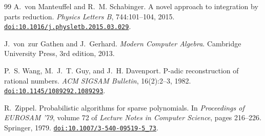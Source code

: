 \documentclass[11pt,a4paper]{article}
\theoremstyle{plain}
\theoremstyle{definition}
\theoremstyle{remark}
\newcommand{\doi}[1]{\href{https://doi.org/#1}{\nolinkurl{doi:#1}}}
\begin{document}
\begin{thebibliography}{99}
A.~von Manteuffel and R.~M. Schabinger.
\newblock A novel approach to integration by parts reduction.
\newblock \emph{Physics Letters B}, 744:101--104, 2015.
\newblock \doi{10.1016/j.physletb.2015.03.029}.

J.~von~zur Gathen and J.~Gerhard.
\newblock \emph{Modern Computer Algebra}.
\newblock Cambridge University Press, 3rd edition, 2013.

P.~S. Wang, M.~J.~T. Guy, and J.~H. Davenport.
\newblock P-adic reconstruction of rational numbers.
\newblock \emph{ACM SIGSAM Bulletin}, 16(2):2--3, 1982.
\newblock \doi{10.1145/1089292.1089293}.

R.~Zippel.
\newblock Probabilistic algorithms for sparse polynomials.
\newblock In \emph{Proceedings of EUROSAM '79}, volume 72 of \emph{Lecture Notes in Computer
Science}, pages 216--226. Springer, 1979.
\newblock \doi{10.1007/3-540-09519-5_73}.

\end{thebibliography}
\end{document}
